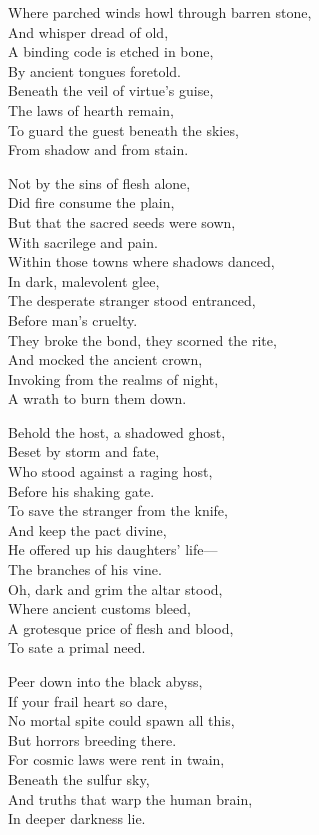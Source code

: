 \begin{lyrics}
Where parched winds howl through barren stone,\\
And whisper dread of old,\\
A binding code is etched in bone,\\
By ancient tongues foretold.\\
Beneath the veil of virtue's guise,\\
The laws of hearth remain,\\
To guard the guest beneath the skies,\\
From shadow and from stain.

Not by the sins of flesh alone,\\
Did fire consume the plain,\\
But that the sacred seeds were sown,\\
With sacrilege and pain.\\
Within those towns where shadows danced,\\
In dark, malevolent glee,\\
The desperate stranger stood entranced,\\
Before man's cruelty.\\
They broke the bond, they scorned the rite,\\
And mocked the ancient crown,\\
Invoking from the realms of night,\\
A wrath to burn them down.

Behold the host, a shadowed ghost,\\
Beset by storm and fate,\\
Who stood against a raging host,\\
Before his shaking gate.\\
To save the stranger from the knife,\\
And keep the pact divine,\\
He offered up his daughters' life—\\
The branches of his vine.\\
Oh, dark and grim the altar stood,\\
Where ancient customs bleed,\\
A grotesque price of flesh and blood,\\
To sate a primal need.

Peer down into the black abyss,\\
If your frail heart so dare,\\
No mortal spite could spawn all this,\\
But horrors breeding there.\\
For cosmic laws were rent in twain,\\
Beneath the sulfur sky,\\
And truths that warp the human brain,\\
In deeper darkness lie.


\end{lyrics}
